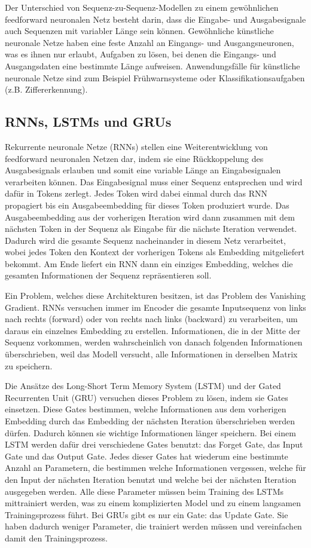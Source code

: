 Der Unterschied von Sequenz-zu-Sequenz-Modellen zu einem gewöhnlichen feedforward neuronalen Netz besteht darin, dass die Eingabe- und Ausgabesignale auch Sequenzen mit variabler Länge sein können.
Gewöhnliche künstliche neuronale Netze haben eine feste Anzahl an Eingangs- und Ausgangsneuronen, was es ihnen nur erlaubt, Aufgaben zu lösen, bei denen die Eingangs- und Ausgangsdaten eine bestimmte Länge aufweisen.
Anwendungsfälle für künstliche neuronale Netze sind zum Beispiel Frühwarnsysteme oder Klassifikationsaufgaben (z.B. Ziffererkennung).

\subsection{RNNs, LSTMs und GRUs}

Rekurrente neuronale Netze (RNNs) stellen eine Weiterentwicklung von feedforward neuronalen Netzen dar, indem sie eine Rückkoppelung des Ausgabesignals erlauben und somit eine variable Länge an Eingabesignalen verarbeiten können.
Das Eingabesignal muss einer Sequenz entsprechen und wird dafür in Tokens zerlegt.
Jedes Token wird dabei einmal durch das RNN propagiert bis ein Ausgabeembedding für dieses Token produziert wurde.
Das Ausgabeembedding aus der vorherigen Iteration wird dann zusammen mit dem nächsten Token in der Sequenz als Eingabe für die nächste Iteration verwendet.
Dadurch wird die gesamte Sequenz nacheinander in diesem Netz verarbeitet, wobei jedes Token den Kontext der vorherigen Tokens als Embedding mitgeliefert bekommt.
Am Ende liefert ein RNN dann ein einziges Embedding, welches die gesamten Informationen der Sequenz repräsentieren soll.

Ein Problem, welches diese Architekturen besitzen, ist das Problem des Vanishing Gradient.
RNNs versuchen immer im Encoder die gesamte Inputsequenz von links nach rechts (forward) oder von rechts nach links (backward) zu verarbeiten, um daraus ein einzelnes Embedding zu erstellen.
Informationen, die in der Mitte der Sequenz vorkommen, werden wahrscheinlich von danach folgenden Informationen überschrieben, weil das Modell versucht, alle Informationen in derselben Matrix zu speichern. 

Die Ansätze des Long-Short Term Memory System (LSTM) und der Gated Recurrenten Unit (GRU) versuchen dieses Problem zu lösen, indem sie Gates einsetzen.
Diese Gates bestimmen, welche Informationen aus dem vorherigen Embedding durch das Embedding der nächsten Iteration überschrieben werden dürfen.
Dadurch können sie wichtige Informationen länger speichern.
Bei einem LSTM werden dafür drei verschiedene Gates benutzt: das Forget Gate, das Input Gate und das Output Gate.
Jedes dieser Gates hat wiederum eine bestimmte Anzahl an Parametern, die bestimmen welche Informationen vergessen, welche für den Input der nächsten Iteration benutzt und welche bei der nächsten Iteration ausgegeben werden.
Alle diese Parameter müssen beim Training des LSTMs mittrainiert werden, was zu einem komplizierten Model und zu einem langsamen Trainingsprozess führt.
Bei GRUs gibt es nur ein Gate: das Update Gate.
Sie haben dadurch weniger Parameter, die trainiert werden müssen und vereinfachen damit den Trainingsprozess.
\cite{pirani2022}

